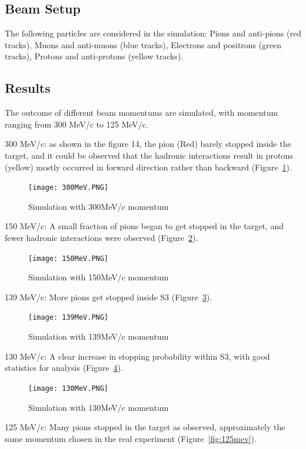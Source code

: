 \documentclass[11pt,a4paper]{article}
\begin{document}
\subsection{Beam Setup}
The following particles are considered in the simulation: Pions and anti-pions (red tracks), Muons and anti-muons (blue tracks), Electrons and positrons (green tracks), Protons and anti-protons (yellow tracks). 

\subsection{Results}
The outcome of different beam momentums are simulated, with momentum ranging from 300 MeV/c to 125 MeV/c. 

300 MeV/c: as shown in the figure 14, the pion (Red) barely stopped inside the target, and it could be observed that the hadronic interactions result in protons (yellow) mostly occurred in forward direction rather than backward (Figure~\ref{fig:300mev}).

\begin{figure}[h]
\centering
\texttt{[image: 300MeV.PNG]}
\caption{Simulation with 300MeV/c momentum}
\label{fig:300mev}
\end{figure}

150 MeV/c: A small fraction of pions began to get stopped in the target, and fewer hadronic interactions were observed (Figure~\ref{fig:150mev}).

\begin{figure}[h]
\centering
\texttt{[image: 150MeV.PNG]}
\caption{Simulation with 150MeV/c momentum}
\label{fig:150mev}
\end{figure}

139 MeV/c: More pions get stopped inside S3 (Figure~\ref{fig:139mev}).

\begin{figure}[h]
\centering
\texttt{[image: 139MeV.PNG]}
\caption{Simulation with 139MeV/c momentum}
\label{fig:139mev}
\end{figure}

130 MeV/c: A clear increase in stopping probability within S3, with good statistics for analysis (Figure~\ref{fig:130mev}).

\begin{figure}[h]
\centering
\texttt{[image: 130MeV.PNG]}
\caption{Simulation with 130MeV/c momentum}
\label{fig:130mev}
\end{figure}

125 MeV/c: Many pions stopped in the target as observed, approximately the same momentum chosen in the real experiment (Figure~\ref{fig:125mev}).
\end{document}
